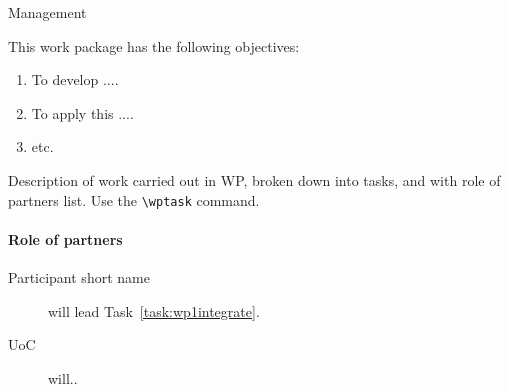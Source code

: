 
\begin{workpackage}{Management}
  \label{wp:management} %



  \makewptable %
    
  \begin{wpobjectives}
    This work package has the following objectives:
    \begin{enumerate}
    \item To develop ....
    \item To apply this ....
    \item etc.
    \end{enumerate}
  \end{wpobjectives}
  
  \begin{wpdescription}
 
    Description of work carried out in WP, broken down into tasks, and
    with role of partners list. Use the \texttt{\textbackslash wptask} command.

    
    \paragraph{Role of partners}
    \begin{description}
    \item[Participant short name] will lead Task~\ref{task:wp1integrate}.
    \item[UoC] will..
    \end{description}
  \end{wpdescription}
  

\end{workpackage}
